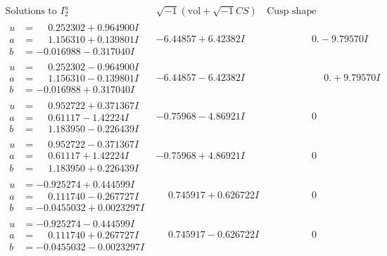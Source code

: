\documentclass[1p]{elsarticle_modified}
\theoremstyle{definition}
\newcommand{\I}{\sqrt{-1}}
\begin{document}
$$\begin{array}{c|c|c}  
\text{Solutions to }I^u_{2}& \I (\text{vol} + \sqrt{-1}CS) & \text{Cusp shape}\\
 \hline 
\begin{aligned}
u &= \phantom{-}0.252302 + 0.964900 I \\
a &= \phantom{-}1.156310 + 0.139801 I \\
b &= -0.016988 - 0.317040 I\end{aligned}
 & -6.44857 + 6.42382 I & \phantom{-0.000000 } 0. - 9.79570 I \\ \hline\begin{aligned}
u &= \phantom{-}0.252302 - 0.964900 I \\
a &= \phantom{-}1.156310 - 0.139801 I \\
b &= -0.016988 + 0.317040 I\end{aligned}
 & -6.44857 - 6.42382 I & \phantom{-0.000000 -}0. + 9.79570 I \\ \hline\begin{aligned}
u &= \phantom{-}0.952722 + 0.371367 I \\
a &= \phantom{-}0.61117 - 1.42224 I \\
b &= \phantom{-}1.183950 - 0.226439 I\end{aligned}
 & -0.75968 - 4.86921 I & \phantom{-0.000000 } 0 \\ \hline\begin{aligned}
u &= \phantom{-}0.952722 - 0.371367 I \\
a &= \phantom{-}0.61117 + 1.42224 I \\
b &= \phantom{-}1.183950 + 0.226439 I\end{aligned}
 & -0.75968 + 4.86921 I & \phantom{-0.000000 } 0 \\ \hline\begin{aligned}
u &= -0.925274 + 0.444599 I \\
a &= \phantom{-}0.111740 - 0.267727 I \\
b &= -0.0455032 + 0.0023297 I\end{aligned}
 & \phantom{-}0.745917 + 0.626722 I & \phantom{-0.000000 } 0 \\ \hline\begin{aligned}
u &= -0.925274 - 0.444599 I \\
a &= \phantom{-}0.111740 + 0.267727 I \\
b &= -0.0455032 - 0.0023297 I\end{aligned}
 & \phantom{-}0.745917 - 0.626722 I & \phantom{-0.000000 } 0 \\ \hline\begin{aligned}

\end{aligned}
\end{array}$$
\end{document}
